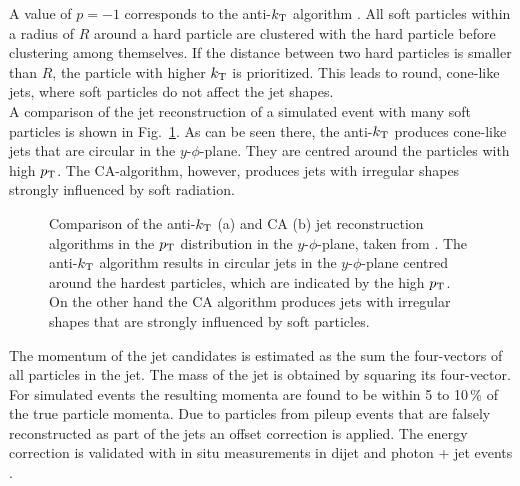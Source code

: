 \noindent A value of $p=-1$ corresponds to the anti-$k_{\rm T}$ algorithm \cite{antikt}. All soft particles within a radius of $R$ around a hard particle are clustered with the hard particle before clustering among themselves. If the distance between two hard particles is smaller than $R$, the particle with higher $k_{\rm T}$ is prioritized. This leads to round, cone-like jets, where soft particles do not affect the jet shapes.\\

\noindent A comparison of the jet reconstruction of a simulated event with many soft particles is shown in Fig.~\ref{fig:eventreco:jet_reco}. As can be seen there, the anti-$k_{\rm T}$ produces cone-like jets that are circular in the $y$-$\phi$-plane. They are centred around the particles with high $p_{\rm T}$. The CA-algorithm, however, produces jets with irregular shapes strongly influenced by soft radiation.\\
\begin{figure}
	\begin{minipage}{0.5\textwidth}
	\end{minipage}%
	\begin{minipage}{0.5\textwidth}
	\end{minipage}
	\caption[Comparison of the anti-$k_{\rm T}$ and CA jet reconstruction algorithms]{Comparison of the anti-$k_{\rm T}$ (a) and CA (b) jet reconstruction algorithms in the $p_{\rm T}$ distribution in the $y$-$\phi$-plane, taken from \cite{antikt}. The anti-$k_{\rm T}$ algorithm results in circular jets in the $y$-$\phi$-plane centred around the hardest particles, which are indicated by the high $p_{\rm T}$. On the other hand the CA algorithm produces jets with irregular shapes that are strongly influenced by soft particles.}
	\label{fig:eventreco:jet_reco}
\end{figure}

\noindent The momentum of the jet candidates is estimated as the sum the four-vectors of all particles in the jet. The mass of the jet is obtained by squaring its four-vector. For simulated events the resulting momenta are found to be within 5 to 10\,\% of the true particle momenta. Due to particles from pileup events that are falsely reconstructed as part of the jets an offset correction is applied. The energy correction is validated with in situ measurements in dijet and photon + jet events \cite{jetcorrection}.\\

